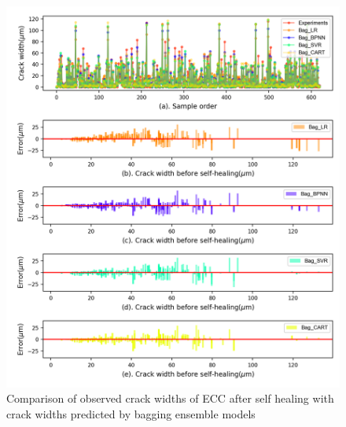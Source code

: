 \documentclass[11pt]{article}
\begin{document}
	\begin{figure}[!h]
		\centering
		\includegraphics[width=\textwidth]{bagError.png}
		\caption{Comparison of observed crack widths of ECC after self healing with crack widths predicted by bagging ensemble models}
		\label{error2}
	\end{figure}
	
\end{document}
